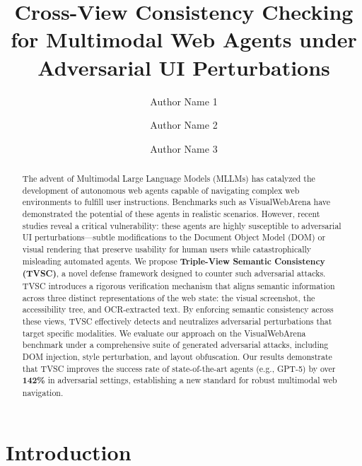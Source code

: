 \documentclass[runningheads]{llncs}
\begin{document}
\title{Cross-View Consistency Checking for Multimodal Web Agents under Adversarial UI Perturbations}
\author{Author Name 1 \and Author Name 2 \and Author Name 3}

\maketitle

\begin{abstract}
The advent of Multimodal Large Language Models (MLLMs) has catalyzed the development of autonomous web agents capable of navigating complex web environments to fulfill user instructions. Benchmarks such as VisualWebArena have demonstrated the potential of these agents in realistic scenarios. However, recent studies reveal a critical vulnerability: these agents are highly susceptible to adversarial UI perturbations---subtle modifications to the Document Object Model (DOM) or visual rendering that preserve usability for human users while catastrophically misleading automated agents. We propose \textbf{Triple-View Semantic Consistency (TVSC)}, a novel defense framework designed to counter such adversarial attacks. TVSC introduces a rigorous verification mechanism that aligns semantic information across three distinct representations of the web state: the visual screenshot, the accessibility tree, and OCR-extracted text. By enforcing semantic consistency across these views, TVSC effectively detects and neutralizes adversarial perturbations that target specific modalities. We evaluate our approach on the VisualWebArena benchmark under a comprehensive suite of generated adversarial attacks, including DOM injection, style perturbation, and layout obfuscation. Our results demonstrate that TVSC improves the success rate of state-of-the-art agents (e.g., GPT-5) by over \textbf{142\%} in adversarial settings, establishing a new standard for robust multimodal web navigation.

\end{abstract}

\section{Introduction}
\end{document}
